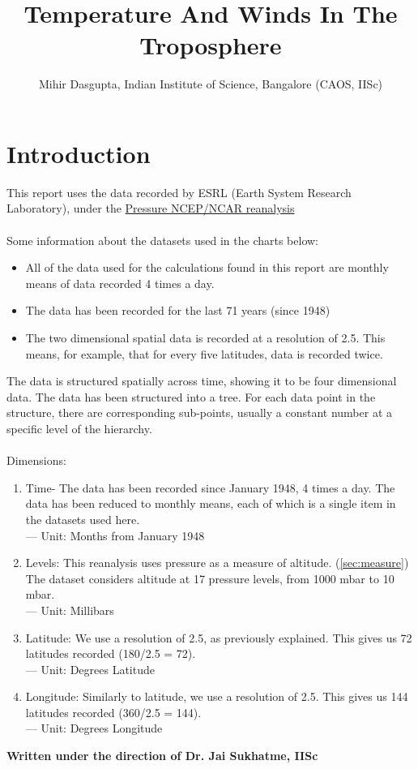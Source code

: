 \documentclass[hidelinks]{article}
\title{Temperature And Winds In The Troposphere}
\author{Mihir Dasgupta, Indian Institute of Science, Bangalore (CAOS, IISc)}
\begin{document}
	\maketitle
	\newpage	
	\tableofcontents

\newpage

\section{Introduction}
This report uses the data recorded by ESRL (Earth System Research Laboratory), under the \href{https://www.esrl.noaa.gov/psd/data/gridded/data.ncep.reanalysis.pressure.html}{Pressure NCEP/NCAR reanalysis} \cite{kalnay1996ncep}
\\\\
Some information about the datasets used in the charts below:
\begin{itemize}
	\item All of the data used for the calculations found in this report are monthly means of data recorded 4 times a day. 
	\item The data has been recorded for the last 71 years (since 1948)
	\item The two dimensional spatial data is recorded at a resolution of 2.5. This means, for example, that for every five latitudes, data is recorded twice.
\end{itemize}
\noindent The data is structured spatially across time, showing it to be four dimensional data. The data has been structured into a tree. For each data point in the structure, there are corresponding sub-points, usually a constant number at a specific level of the hierarchy. 
\\\\ Dimensions:
\begin{enumerate}
	\item Time- The data has been recorded since January 1948, 4 times a day. The data has been reduced to monthly means, each of which is a single item in the datasets used here.
	\\--- Unit: Months from January 1948
	\item Levels: This reanalysis uses pressure as a measure of altitude. (\ref{sec:measure}) The dataset considers altitude at 17 pressure levels, from 1000 mbar to 10 mbar. 
	\\--- Unit: Millibars
	\item Latitude: We use a resolution of 2.5, as previously explained. This gives us 72 latitudes recorded (180/2.5 = 72).
	\\--- Unit: Degrees Latitude
	\item Longitude: Similarly to latitude, we use a resolution of 2.5. This gives us 144 latitudes recorded (360/2.5 = 144).
	\\--- Unit: Degrees Longitude
\end{enumerate}
\textbf{Written under the direction of Dr. Jai Sukhatme, IISc}
\end{document}

